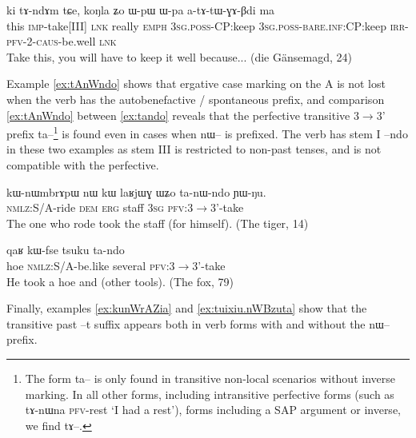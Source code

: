 \documentclass[oldfontcommands,oneside,a4paper,11pt]{article}
\newcommand{\ipa}[1]{{\phon \mbox{#1}}} %
\begin{document}
 \begin{exe}
\ex \label{ex:ki.tAndAm}
\gll
\ipa{ki}  	\ipa{tɤ-ndɤm}  	\ipa{tɕe,}  	\ipa{koŋla}  	\ipa{ʑo}   \ipa{ɯ-pɯ}  	\ipa{ɯ-pa}  	\ipa{a-tɤ-tɯ-ɣɤ-βdi}  	\ipa{ma}  \\
this \textsc{imp}-take[III] \textsc{lnk} really \textsc{emph} \textsc{3sg.poss}-CP:keep \textsc{3sg.poss}-\textsc{bare.inf}:CP:keep \textsc{irr-pfv-2-caus}-be.well \textsc{lnk} \\
\glt Take this, you will have to keep it well because... (die Gänsemagd, 24)
\end{exe}

Example \ref{ex:tAnWndo} shows that ergative case marking on the A is not lost when the verb has the autobenefactive / spontaneous prefix, and comparison \ref{ex:tAnWndo} between  \ref{ex:tando} reveals that the perfective transitive 3$\rightarrow$3' prefix \ipa{ta--}\footnote{The  form \ipa{ta--} is only found in transitive non-local scenarios without inverse marking. In all other forms, including  intransitive perfective forms (such as \ipa{tɤ-nɯna} \textsc{pfv}-rest `I had a rest'), forms including a SAP argument or inverse, we find \ipa{tɤ--}.  } is found even in cases when \ipa{nɯ--} is prefixed. The verb has stem I \ipa{--ndo} in these two examples as stem III is restricted to non-past tenses, and is not compatible with the perfective.

 \begin{exe}
\ex \label{ex:tAnWndo}
\gll
\ipa{kɯ-nɯmbrɤpɯ} 	\ipa{nɯ} 	\ipa{kɯ} 	\ipa{laʁjɯɣ} 	\ipa{ɯʑo} 	\ipa{ta-nɯ-ndo} 	\ipa{ɲɯ-ŋu.} \\
\textsc{nmlz}:S/A-ride \textsc{dem} \textsc{erg} staff \textsc{3sg} \textsc{pfv}:3$\rightarrow$3'-take  \\ 
\glt The one who rode took the staff (for himself). (The tiger, 14) 
\end{exe}

 \begin{exe}
\ex \label{ex:tando}
\gll 
\ipa{qaʁ} 	\ipa{kɯ-fse} 	\ipa{tsuku} 	\ipa{ta-ndo}  \\
hoe  \textsc{nmlz}:S/A-be.like several \textsc{pfv}:3$\rightarrow$3'-take  \\ 
 \glt He took a hoe and (other tools). (The fox, 79)
\end{exe} 

Finally, examples \ref{ex:kunWrAZia} and \ref{ex:tuixiu.nWBzuta} show that the transitive past \ipa{--t} suffix appears both in verb forms with and without the \ipa{nɯ--} prefix.
\end{document}
